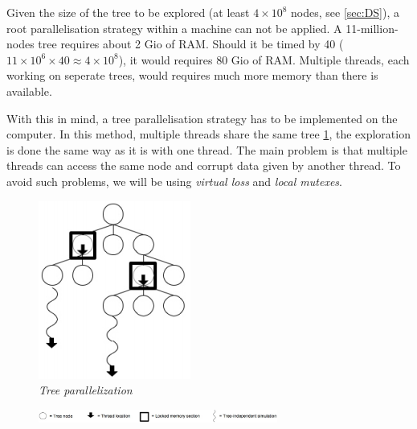 Given the size of the tree to be explored (at least \ensuremath{4 \times 10^8} nodes, see \ref{sec:DS}), a root parallelisation strategy within a machine can not be applied. A 11-million-nodes tree requires about 2 Gio of RAM. Should it be timed by 40 (\ensuremath{11 \times 10^6 \times 40 \approx 4 \times 10^8}), it would requires 80 Gio of RAM. Multiple threads, each working on seperate trees, would requires much more memory than there is available.
	

With this in mind, a tree parallelisation strategy has to be implemented on the computer. In this method, multiple threads share the same tree \ref{fig:TreeParallelization}, the exploration is done the same way as it is with one thread. The main problem is that multiple threads can access the same node and corrupt data given by another thread. To avoid such problems, we will be using \textit{virtual loss} and \textit{local mutexes}.

\begin{figure}[H]
\centerline{\includegraphics[]{Parallelisation/Computer/Img/Tree.png}}
\caption{\label{fig:TreeParallelization}\textit{Tree parallelization}}
\end{figure}
\begin{figure}[H]
\centerline{\includegraphics[width=0.7\textwidth]{Parallelisation/Computer/Img/legend.png}}
\end{figure}

